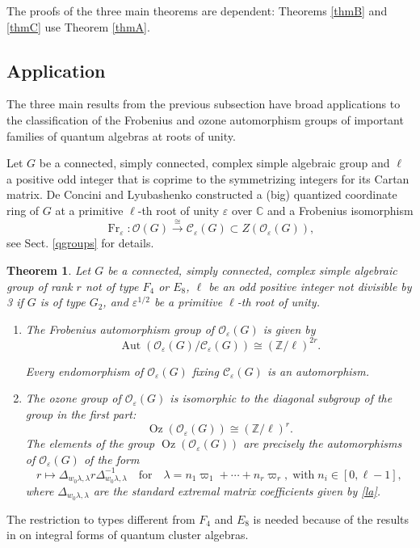 \documentclass[11pt]{amsart}
\theoremstyle{plain}
\newtheorem{thmintro}{Theorem}
\def \Zset {{\mathbb Z}}
\def \Cset {{\mathbb C}}
\def \cC {\mathcal{C}}
\def \OO {{\mathcal{O}}}
\def \la {\lambda}
\def \ep {\varepsilon}
\def \mt  {\mapsto}
\DeclareMathOperator \Aut { {\mathrm{Aut}} }
\DeclareMathOperator \Oz { {\mathrm{Oz}}}
\DeclareMathOperator \Fr { {\mathrm{Fr}}}
\begin{document}
The proofs of the three main theorems are dependent: Theorems \ref{thmB} and \ref{thmC} use Theorem \ref{thmA}.

\subsection{Application} The three main results from the previous subsection have broad applications to the classification 
of the Frobenius and ozone automorphism groups of important families of quantum algebras at roots of unity. 

Let $G$ be a connected, simply connected, complex simple algebraic group and $\ell$ a positive odd integer that is coprime to the 
symmetrizing integers for its Cartan matrix. De Concini and Lyubashenko \cite{DCL94} 
constructed a (big) quantized coordinate ring of $G$ 
at a primitive $\ell$-th root of unity $\ep$ over $\Cset$ and a Frobenius isomorphism 
\[
\Fr_\ep : \OO(G) \stackrel{\cong}{\longrightarrow} \cC_\ep(G) \subset Z( \OO_\ep(G)),
\]
see Sect. \ref{qgroups} for details. 

\begin{thmintro} 
\label{thmD}
Let $G$ be a connected, simply connected, complex simple algebraic group of rank $r$ not of type $F_4$ or $E_8$, $\ell$ be an odd positive integer not divisible by 3 if $G$ is of type $G_2$, and $\ep^{1/2}$ be a primitive $\ell$-th root of unity. 

\begin{enumerate}
\item[(i)] The Frobenius automorphism group of $\OO_\ep(G)$  is given by 
\[
\Aut(\OO_\ep(G)/\cC_\ep(G)) \cong (\Zset/\ell)^{2r}.
\]

Every endomorphism of $\OO_\ep(G)$ fixing $\cC_\ep(G)$ is an automorphism.

\item[(ii)] The ozone group of $\OO_\ep(G)$ is isomorphic to the diagonal subgroup of the group in the first part:
\[
\Oz(\OO_\ep(G)) \cong (\Zset/\ell)^r.
\]
The elements of the group $\Oz(\OO_\ep(G))$ are precisely the automorphisms of $\OO_\ep(G)$ of the form 
\[
r \mt 
\Delta_{w_0 \la, \la} r \Delta_{w_0 \la, \la}^{-1} \quad \mbox{for} \quad\la = n_1 \varpi_1 + \cdots + n_r \varpi_r, \; \mbox{with} \; n_i \in [0, \ell -1],
\]
where $\Delta_{w_0 \la, \la}$ are the standard extremal matrix coefficients given by \eqref{la}.
\end{enumerate}
\end{thmintro}

The restriction to types different from $F_4$ and $E_8$ is needed because of the results in \cite{OQY26} on integral forms of quantum cluster algebras. 
\end{document}
